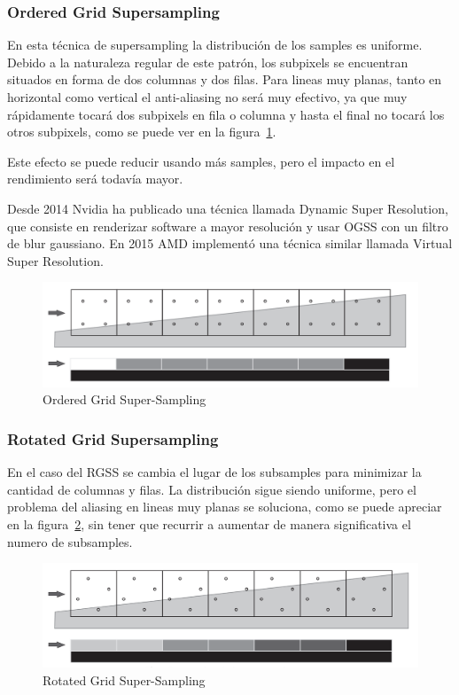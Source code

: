 \documentclass[withindex, glossary]{cam-thesis}
\begin{document}
\subsubsection{Ordered Grid Supersampling}

En esta técnica de supersampling la distribución de los samples es uniforme. Debido a la naturaleza regular de este patrón, los subpixels se encuentran situados en forma de dos columnas y dos filas. Para lineas muy planas, tanto en horizontal como vertical el anti-aliasing no será muy efectivo, ya que muy rápidamente tocará dos subpixels en fila o columna y hasta el final no tocará los otros subpixels, como se puede ver en la figura~\ref{ogss}.

Este efecto se puede reducir usando más samples, pero el impacto en el rendimiento será todavía mayor.

Desde 2014 Nvidia ha publicado una técnica llamada Dynamic Super Resolution\cite{960}, que consiste en renderizar software a mayor resolución y usar OGSS con un filtro de blur gaussiano. En 2015 AMD implementó una técnica similar llamada Virtual Super Resolution.

\begin{figure}[!htbp]
    \includegraphics[width=\linewidth]{figures/ogss.png}
    \caption{Ordered Grid Super-Sampling\cite{Beets2000SupersamplingAA}}
    \label{ogss}
\end{figure}

\subsubsection{Rotated Grid Supersampling}

En el caso del RGSS se cambia el lugar de los subsamples para minimizar la cantidad de columnas y filas. La distribución sigue siendo uniforme, pero el problema del aliasing en lineas muy planas se soluciona, como se puede apreciar en la figura~\ref{rgss}, sin tener que recurrir a aumentar de manera significativa el numero de subsamples.

\begin{figure}[!htbp]
    \includegraphics[width=\linewidth]{figures/rgss.png}
    \caption{Rotated Grid Super-Sampling\cite{Beets2000SupersamplingAA}}
    \label{rgss}
\end{figure}
\end{document}
